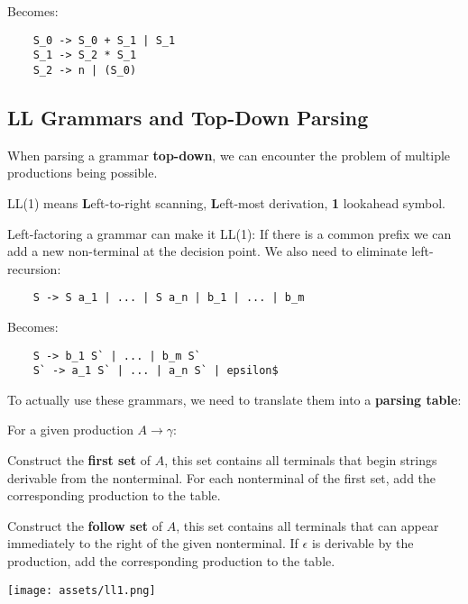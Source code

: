 Becomes:\smallskip

\begin{lstlisting}
	S_0 -> S_0 + S_1 | S_1
	S_1 -> S_2 * S_1
	S_2 -> n | (S_0)
\end{lstlisting}


\subsection*{LL Grammars and Top-Down Parsing}

When parsing a grammar \textbf{top-down}, we can encounter the problem of multiple productions being possible. \medskip

LL(1) means \textbf{L}eft-to-right scanning, \textbf{L}eft-most derivation, \textbf{1} lookahead symbol. \medskip

Left-factoring a grammar can make it LL(1): If there is a common prefix we can add a new non-terminal at the decision point. We also need to eliminate left-recursion:\smallskip

\begin{lstlisting}
 	S -> S a_1 | ... | S a_n | b_1 | ... | b_m
\end{lstlisting}\smallskip

Becomes:\smallskip

\begin{lstlisting}		
	S -> b_1 S` | ... | b_m S`		
	S` -> a_1 S` | ... | a_n S` | epsilon$
\end{lstlisting}\medskip

To actually use these grammars, we need to translate them into a \textbf{parsing table}: \medskip

For a given production $A \to \gamma$:
\begin{compactitem}
	\item Construct the \textbf{first set} of $A$, this set contains all terminals that begin strings derivable from the nonterminal. For each nonterminal of the first set, add the corresponding production to the table.

	\item Construct the \textbf{follow set} of $A$, this set contains all terminals that can appear immediately to the right of the given nonterminal. If $\epsilon$ is derivable by the production, add the corresponding production to the table.
\end{compactitem}

\begin{center}
	\texttt{[image: assets/ll1.png]}
\end{center}

